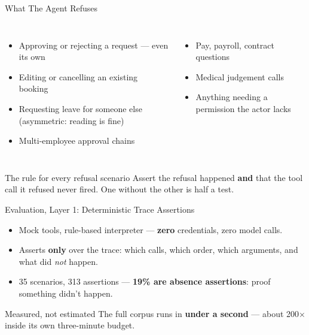 \documentclass[aspectratio=169]{beamer}
\begin{document}
\begin{frame}{What The Agent Refuses}
  \small
  \begin{columns}[T,onlytextwidth]
    \begin{itemize}
      \item Approving or rejecting a request --- even its own
      \item Editing or cancelling an existing booking
      \item Requesting leave for someone else (asymmetric: reading is fine)
      \item Multi-employee approval chains
    \end{itemize}
    \begin{itemize}
      \item Pay, payroll, contract questions
      \item Medical judgement calls
      \item Anything needing a permission the actor lacks
    \end{itemize}
  \end{columns}
  \vspace{0.6em}
  \begin{alertblock}{The rule for every refusal scenario}
    Assert the refusal happened \textbf{and} that the tool call it refused
    never fired. One without the other is half a test.
  \end{alertblock}
\end{frame}

\begin{frame}{Evaluation, Layer 1: Deterministic Trace Assertions}
  \begin{itemize}
    \item Mock tools, rule-based interpreter --- \textbf{zero} credentials,
      zero model calls.
    \item Asserts \textbf{only} over the trace: which calls, which order,
      which arguments, and what did \emph{not} happen.
    \item 35 scenarios, 313 assertions --- \textbf{19\% are absence
      assertions}: proof something didn't happen.
  \end{itemize}
  \vspace{0.7em}
  \begin{block}{Measured, not estimated}
    The full corpus runs in \textbf{under a second} --- about 200$\times$
    inside its own three-minute budget.
  \end{block}
\end{frame}
\end{document}
